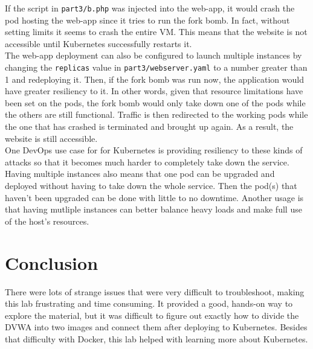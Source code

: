 \documentclass[11pt]{article}
\begin{document}
If the script in \verb|part3/b.php| was injected into the web-app, it would crash the pod hosting
the web-app since it tries to run the fork bomb. In fact, without setting limits it seems to
crash the entire VM. This means that the website is not accessible until Kubernetes successfully
restarts it.\\ 
The web-app deployment can also be configured to launch multiple instances by changing the 
\verb|replicas| value in \verb|part3/webserver.yaml| to a number greater than 1 and redeploying it. 
Then, if the fork bomb
was run now, the application would have greater resiliency to it. In other words, given that
resource limitations have been set on the pods, the fork bomb would only take down one of the pods
while the others are still functional. Traffic is then redirected to the working pods while the
one that has crashed is terminated and brought up again. As a result, the website is still
accessible.\\
One DevOps use case for for Kubernetes is providing resiliency to these kinds of attacks so that
it becomes much harder to completely take down the service. Having multiple instances also means
that one pod can be upgraded and deployed without having to take down the whole service. Then the
pod(s) that haven't been upgraded can be done with little to no downtime. Another usage is that
having mutliple instances can better balance heavy loads and make full use of the host's resources.
\section*{Conclusion}
There were lots of strange issues that were very difficult to troubleshoot, making this lab
frustrating and time consuming. It provided a good, hands-on way to explore the material,
but it was difficult to figure out exactly how to divide the DVWA into two images and connect them
after deploying to Kubernetes. Besides that difficulty with Docker, this lab helped with learning
more about Kubernetes.


\end{document}
